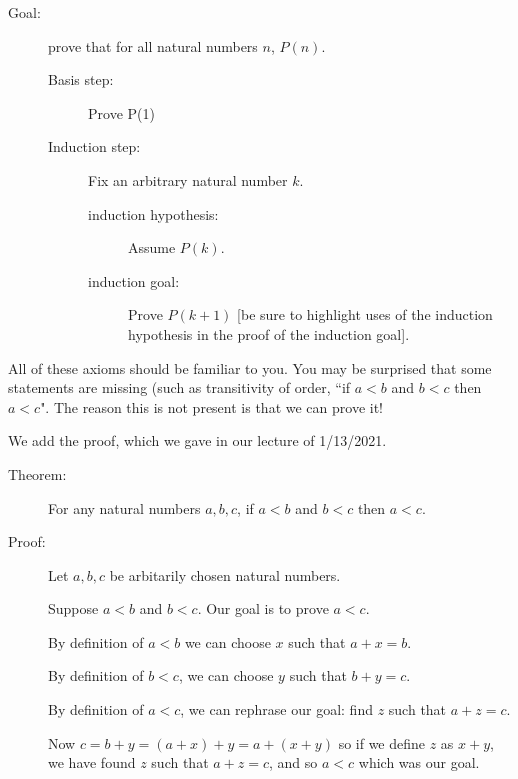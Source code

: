 \documentclass[12pt]{article}
\begin{document}
\begin{description}

\item[Goal:]  prove that for all natural numbers $n$, $P(n)$.

\begin{description}

\item[Basis step:]  Prove P(1)

\item[Induction step:]

Fix an arbitrary natural number $k$.

\begin{description}

\item[induction hypothesis:]  Assume $P(k)$.

\item[induction goal:]  Prove $P(k+1)$ [be sure to highlight uses of the induction hypothesis in the proof of the induction goal].

\end{description}


\end{description}

\end{description}

All of these axioms should be familiar to you.  You may be surprised that some statements are missing (such as transitivity of order, ``if $a<b$ and $b<c$ then $a<c$".   The reason this is not present is that we can prove it!

We add the proof, which we gave in our lecture of 1/13/2021.

\begin{description}

\item[Theorem:]  For any natural numbers $a,b,c$, if $a<b$ and $b<c$ then $a<c$.

\item[Proof:]

Let $a,b,c$ be arbitarily chosen natural numbers.

Suppose $a<b$ and $b<c$.  Our goal is to prove $a<c$.

By definition of $a<b$ we can choose $x$ such that $a+x=b$.

By definition of $b<c$, we can choose $y$ such that $b+y=c$.

By definition of $a<c$, we can rephrase our goal:  find $z$ such that $a+z=c$.

Now $c = b+y = (a+x)+y = a+(x+y)$ so if we define $z$ as $x+y$, we have found
$z$ such that $a+z=c$, and so $a<c$ which was our goal.

\end{description}
\end{document}
